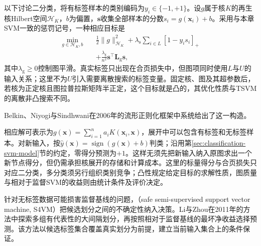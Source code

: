 以下讨论二分类，将有标签样本的类别编码为$y_i\in\{-1,+1\}$。设$g$属于核$K$的再生核Hilbert空间$\mathcal{H}_K$，$b$为偏置，$\bm{s}$收集全部样本的分数$s_i=g(\bm{x}_i)+b$。采用与本章SVM一致的惩罚记号，一种相应目标是
\begin{equation}
  \label{eq:classification-laplacian-svm}
  \begin{aligned}
    \min_{g\in\mathcal{H}_K,b}\quad
      &\frac12\lVert g\rVert_{\mathcal{H}_K}^2
       +\lambda_{\mathrm{s}}\sum_{i\in L}[1-y_i s_i]_+\\
      &+\frac{\lambda_{\mathrm{g}}}{n^2}
        \bm{s}^{\top}\bm{L}_{\mathrm{g}}\bm{s},
  \end{aligned}
\end{equation}
其中$\lambda_{\mathrm{g}}\geq0$控制图平滑。真实标签只出现在合页损失中，但图项同时使用$L$与$U$的输入关系；这里不为$U$引入需要离散搜索的标签变量。固定核、图及其超参数后，若核为正定核且图拉普拉斯矩阵半正定，这个目标就是凸的，其优化性质与TSVM的离散非凸搜索不同。

Belkin、Niyogi与Sindhwani在2006年的流形正则化框架中系统给出了这一构造。

相应解可表示为$g(\bm{x})=\sum_{i=1}^{n}a_iK(\bm{x}_i,\bm{x})$，展开中可以包含有标签和无标签样本。对新输入，按$\hat y(\bm{x})=\operatorname{sign}(g(\bm{x})+b)$判类；沿用第\ref{sec:classification-svm-model}节的约定，零得分预测为$+1$。这样无须先把新输入纳入原图求出一个新节点得分，但仍需承担核展开的存储和计算成本。这里的标量得分与合页损失只对应二分类，多分类须另行组织类别竞争；凸性规定给定目标的求解性质，图质量与相对于监督SVM的收益则由统计条件及评价决定。

针对无标签数据可能损害监督基线的问题，（safe semi-supervised support vector machine, S4VM）把候选划分之间的不确定性纳入决策。Li与Zhou在2011年的方法中探索多组有代表性的大间隔划分，再按照相对于监督基线的最坏净收益选择预测。该方法以候选标签集合覆盖真实划分为前提，建立当前输入集合上的条件保证。

